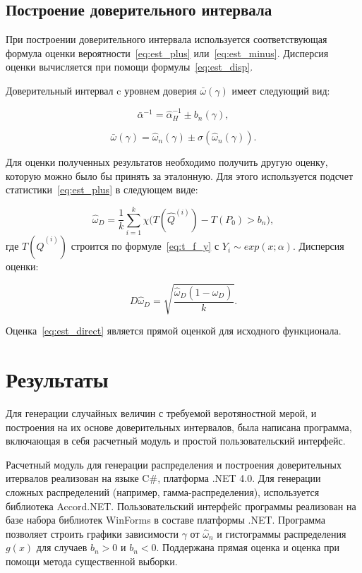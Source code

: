 \documentclass[12pt, specialist, subf, substylefile = spbu.rtx]{disser}
\begin{document}
%
%

\subsection{Построение доверительного интервала}

При построении доверительного интервала используется соответствующая формула оценки вероятности~\eqref{eq:est_plus} или~\eqref{eq:est_minus}. Дисперсия оценки вычисляется при помощи формулы~\eqref{eq:est_disp}.

Доверительный интервал c уровнем доверия $\bar{\omega}(\gamma)$ имеет следующий вид: 

\begin{equation}\label{eq:inter_a}
\bar{\alpha}^{-1} = \hat{\alpha}^{-1}_H \pm b_n(\gamma),
\end{equation}

\begin{equation}\label{eq:inter_w}
\bar{\omega}(\gamma) = \hat{\omega}_n(\gamma) \pm \sigma(\hat{\omega}_n(\gamma)).
\end{equation}

Для оценки полученных результатов необходимо получить другую оценку, которую можно было бы принять за эталонную. Для этого используется подсчет статистики~\eqref{eq:est_plus} в следующем виде:

\begin{equation}\label{eq:est_direct}
\hat{\omega}_D=\frac{1}{k} \sum\limits_{i=1}^{k}
\chi \big(T(\hat{Q}^{(i)})-T(P_0) > b_n\big),
\end{equation}
где $T(\hat{Q}^{(i)})$ строится по формуле~\eqref{eq:t_f_y} с $Y_i \sim exp(x; \alpha)$. Дисперсия оценки:

$$
D \hat{\omega}_D = \sqrt{\frac{\hat{\omega}_D(1-\hat{\omega}_D)}{k}}.
$$

Оценка~\eqref{eq:est_direct} является прямой оценкой для исходного функционала.


\section{Результаты}

%
%

Для генерации случайных величин с требуемой веротяностной мерой, и построения на их основе доверительных интервалов, была написана программа, включающая в себя расчетный модуль и простой пользовательский интерфейс.

Расчетный модуль для генерации распределения и построения доверительных итервалов реализован на языке C\#, платформа .NET 4.0. Для генерации сложных распределений (например, гамма-распределения), используется библиотека Accord.NET. Пользовательский интерфейс программы реализован на базе набора библиотек WinForms в составе платформы .NET. Программа позволяет строить графики зависимости $\gamma$ от $\hat{\omega}_n$ и гистограммы распределения $g(x)$ для случаев $b_n > 0 $ и $b_n < 0$. Поддержана прямая оценка и оценка при помощи метода существенной выборки.
\end{document}
